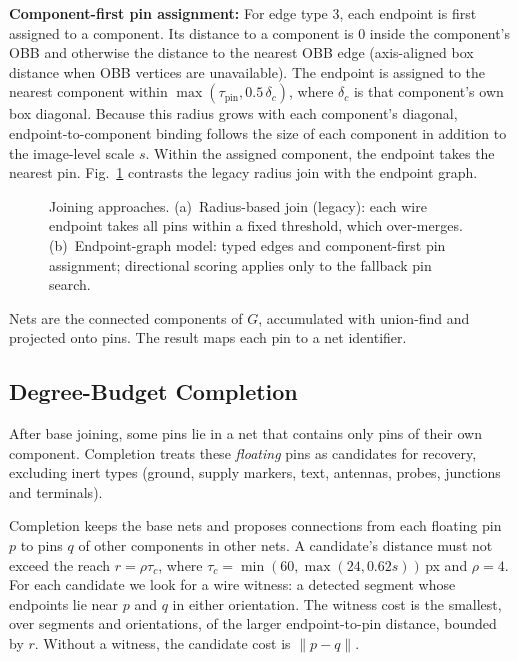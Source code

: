 \documentclass[journal]{IEEEtran}
\begin{document}
\textbf{Component-first pin assignment:} For edge type 3, each endpoint is first assigned to a component. Its distance to a component is 0 inside the component's OBB and otherwise the distance to the nearest OBB edge (axis-aligned box distance when OBB vertices are unavailable). The endpoint is assigned to the nearest component within $\max(\tau_{\text{pin}}, 0.5\,\delta_c)$, where $\delta_c$ is that component's own box diagonal. Because this radius grows with each component's diagonal, endpoint-to-component binding follows the size of each component in addition to the image-level scale $s$. Within the assigned component, the endpoint takes the nearest pin. Fig.~\ref{fig:endpoint_graph} contrasts the legacy radius join with the endpoint graph.

\begin{figure}[t]
\centering

\caption{Joining approaches. (a)~Radius-based join (legacy): each wire endpoint takes all pins within a fixed threshold, which over-merges. (b)~Endpoint-graph model: typed edges and component-first pin assignment; directional scoring applies only to the fallback pin search.}
\label{fig:endpoint_graph}
\end{figure}

Nets are the connected components of $G$, accumulated with union-find and projected onto pins. The result maps each pin to a net identifier.

\subsection{Degree-Budget Completion}
\label{sec:completion}

After base joining, some pins lie in a net that contains only pins of their own component. Completion treats these \emph{floating} pins as candidates for recovery, excluding inert types (ground, supply markers, text, antennas, probes, junctions and terminals).

Completion keeps the base nets and proposes connections from each floating pin $p$ to pins $q$ of other components in other nets. A candidate's distance must not exceed the reach $r=\rho\tau_c$, where $\tau_c=\min(60,\max(24,0.62s))$\,px and $\rho=4$. For each candidate we look for a wire witness: a detected segment whose endpoints lie near $p$ and $q$ in either orientation. The witness cost is the smallest, over segments and orientations, of the larger endpoint-to-pin distance, bounded by $r$. Without a witness, the candidate cost is $\|p-q\|$.
\end{document}
